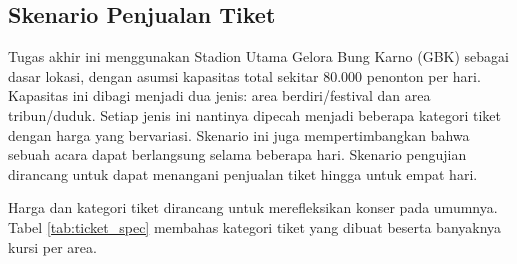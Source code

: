 \subsection{Skenario Penjualan Tiket}

Tugas akhir ini menggunakan Stadion Utama Gelora Bung Karno (GBK) sebagai dasar lokasi, dengan asumsi kapasitas total sekitar 80.000 penonton per hari. Kapasitas ini dibagi menjadi dua jenis: area berdiri/festival dan area tribun/duduk. Setiap jenis ini nantinya dipecah menjadi beberapa kategori tiket dengan harga yang bervariasi. Skenario ini juga mempertimbangkan bahwa sebuah acara dapat berlangsung selama beberapa hari. Skenario pengujian dirancang untuk dapat menangani penjualan tiket hingga untuk empat hari.

Harga dan kategori tiket dirancang untuk merefleksikan konser pada umumnya. Tabel \ref{tab:ticket_spec} membahas kategori tiket yang dibuat beserta banyaknya kursi per area.

